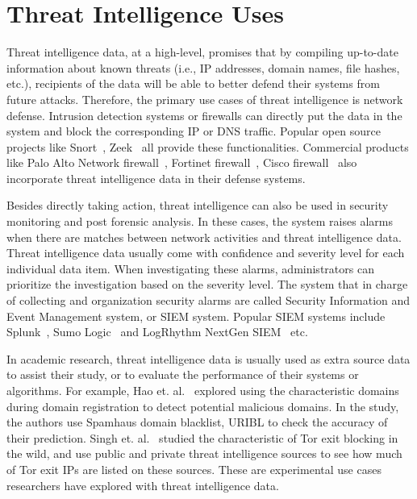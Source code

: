 \section{Threat Intelligence Uses}
\label{sec:threat_intel_uses}

Threat intelligence data, at a high-level, promises that by compiling up-to-date 
information about known threats (i.e., IP addresses, domain names, file hashes, 
etc.), recipients of the data will be able to better defend their systems from 
future attacks. Therefore, the primary use cases of threat intelligence is 
network defense. Intrusion detection systems or firewalls can directly put 
the data in the system and block the corresponding IP or DNS traffic. Popular 
open source projects like Snort~\cite{snortids}, Zeek~\cite{zeekids} all provide 
these functionalities. Commercial products like Palo Alto Network
firewall~\cite{paloaltofirewall}, Fortinet firewall~\cite{fortinetfirewall}, 
Cisco firewall~\cite{ciscofirewall} also incorporate threat intelligence data in 
their defense systems. 

Besides directly taking action, threat intelligence can also be used in security
monitoring and post forensic analysis. In these cases, the system raises alarms
when there are matches between network activities and threat intelligence data.
Threat intelligence data usually come with confidence and severity level for each
individual data item. When investigating these alarms, administrators can 
prioritize the investigation based on the severity level. The system that in 
charge of collecting and organization security alarms are called Security 
Information and Event Management system, or SIEM system. Popular SIEM systems
include Splunk~\cite{splunk}, Sumo Logic~\cite{sumologic} and LogRhythm NextGen 
SIEM~\cite{logrhythm} etc.

In academic research, threat intelligence data is usually used as extra source 
data to assist their study, or to evaluate the performance of their systems or
algorithms. For example, Hao et. al.~\cite{hao2016predator} explored using the
characteristic domains during domain registration to detect potential malicious
domains. In the study, the authors use Spamhaus domain blacklist, URIBL to check 
the accuracy of their prediction. Singh et. al.~\cite{singh2017characterizing} 
studied the characteristic of Tor exit blocking in the wild, and use public and
private threat intelligence sources to see how much of Tor exit IPs are listed
on these sources. These are experimental use cases researchers have explored 
with threat intelligence data. 

